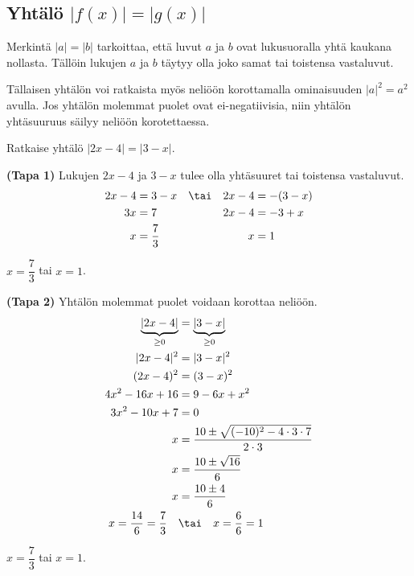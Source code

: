 \subsection*{Yhtälö $|f(x)|=|g(x)|$}

Merkintä $|a|=|b|$ tarkoittaa, että luvut $a$ ja $b$ ovat lukusuoralla yhtä kaukana nollasta. Tällöin lukujen $a$ ja $b$ täytyy olla joko samat tai toistensa vastaluvut.


Tällaisen yhtälön voi ratkaista myös neliöön korottamalla ominaisuuden $|a|^2=a^2$ avulla. Jos yhtälön molemmat puolet ovat ei-negatiivisia, niin yhtälön yhtäsuuruus säilyy neliöön korotettaessa.


\begin{esimerkki}
Ratkaise yhtälö $|2x-4|=|3-x|$.

\begin{esimratk}
\textbf{(Tapa 1)} Lukujen $2x-4$ ja $3-x$ tulee olla yhtäsuuret tai toistensa vastaluvut.
\begin{align*}
2x-4 & =3-x & &\tai & 2x-4 & =-(3-x) \\
3x & =7 && & 2x-4 & =-3+x \\
x & =\frac{7}{3} && & x & =1
\end{align*}
\end{esimratk}

\begin{esimvast}
$x=\dfrac{7}{3}$ tai $x=1$.
\end{esimvast}

\begin{esimratk}
\textbf{(Tapa 2)} Yhtälön molemmat puolet voidaan korottaa neliöön.
\begin{align*}
\underbrace{|2x-4|}_{\geq0} &= \underbrace{|3-x|}_{\geq0}    \\
|2x-4|^2 &= |3-x|^2   \\
(2x-4)^2 &= (3-x)^2   \\
4x^2-16x+16 &= 9 -6x + x^2   \\
3x^2-10x+7 &= 0   \\
x &= \frac{10\pm\sqrt{(-10)^2-4\cdot 3\cdot 7}}{2\cdot 3}   \\
x &= \frac{10\pm\sqrt{16}}{6}   \\		
x &= \frac{10\pm4}{6}     \\
x=\frac{14}{6}=\frac{7}{3} \quad  &\tai \quad x=\frac{6}{6}=1 \\
\end{align*}
\end{esimratk}

\begin{esimvast}
$x=\dfrac{7}{3}$ tai $x=1$.
\end{esimvast}
\end{esimerkki} 

